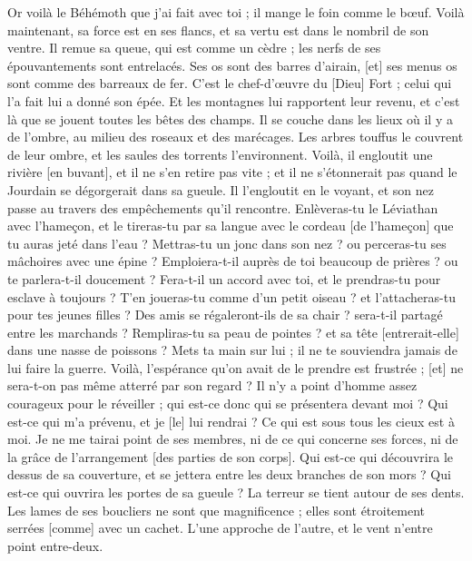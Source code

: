 \begin{multicols}{2}
Or voilà le Béhémoth que j'ai fait avec toi ; il mange le foin comme le bœuf.
Voilà maintenant, sa force est en ses flancs, et sa vertu est dans le nombril de son ventre.
Il remue sa queue, qui est comme un cèdre ; les nerfs de ses épouvantements sont entrelacés.
Ses os sont des barres d'airain, [et] ses menus os sont comme des barreaux de fer.
C'est le chef-d'œuvre du [Dieu] Fort ; celui qui l'a fait lui a donné son épée.
Et les montagnes lui rapportent leur revenu, et c'est là que se jouent toutes les bêtes des champs.
Il se couche dans les lieux où il y a de l'ombre, au milieu des roseaux et des marécages.
Les arbres touffus le couvrent de leur ombre, et les saules des torrents l'environnent.
Voilà, il engloutit une rivière [en buvant], et il ne s'en retire pas vite ; et il ne s'étonnerait pas quand le Jourdain se dégorgerait dans sa gueule.
Il l'engloutit en le voyant, et son nez passe au travers des empêchements qu'il rencontre.
Enlèveras-tu le Léviathan avec l'hameçon, et le tireras-tu par sa langue avec le cordeau [de l'hameçon] que tu auras jeté dans l'eau ?
Mettras-tu un jonc dans son nez ? ou perceras-tu ses mâchoires avec une épine ?
Emploiera-t-il auprès de toi beaucoup de prières ? ou te parlera-t-il doucement ?
Fera-t-il un accord avec toi, et le prendras-tu pour esclave à toujours ?
T'en joueras-tu comme d'un petit oiseau ? et l'attacheras-tu pour tes jeunes filles ?
Des amis se régaleront-ils de sa chair ? sera-t-il partagé entre les marchands ?
Rempliras-tu sa peau de pointes ? et sa tête [entrerait-elle] dans une nasse de poissons ?
Mets ta main sur lui ; il ne te souviendra jamais de lui faire la guerre.
Voilà, l'espérance qu'on avait de le prendre est frustrée ; [et] ne sera-t-on pas même atterré par son regard ?
\VerseOne{}Il n'y a point d'homme assez courageux pour le réveiller ; qui est-ce donc qui se présentera devant moi ?
Qui est-ce qui m'a prévenu, et je [le] lui rendrai ? Ce qui est sous tous les cieux est à moi.
Je ne me tairai point de ses membres, ni de ce qui concerne ses forces, ni de la grâce de l'arrangement [des parties de son corps].
Qui est-ce qui découvrira le dessus de sa couverture, et se jettera entre les deux branches de son mors ?
Qui est-ce qui ouvrira les portes de sa gueule ? La terreur se tient autour de ses dents.
Les lames de ses boucliers ne sont que magnificence ; elles sont étroitement serrées [comme] avec un cachet.
L'une approche de l'autre, et le vent n'entre point entre-deux.

\end{multicols}
